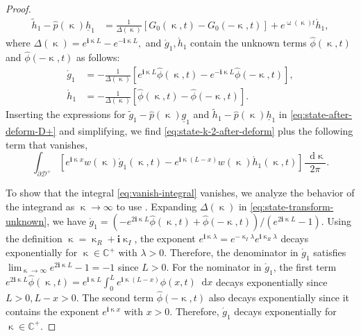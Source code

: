 \documentclass[journal,twoside,web]{ieeecolor}
\newcommand{\CC}{\mathbb{C}}
\newcommand{\D}{\mathcal{D}}
\newcommand{\state}{\phi}
\newcommand{\statehat}{\hat{\state}}
\newcommand{\im}{\mathbf{i}}
\newcommand*\diff{\mathop{}\!\mathrm{d}}
\newcommand{\wcomplex}{\upomega}
\newcommand{\kcomplex}{\upkappa}
\begin{document}
\begin{proof}
\begin{equation*}
\begin{aligned}
		\tilde{h}_1 - \hat{p}(\kcomplex)\underline{h}_1&= \frac{1}{\Delta(\kcomplex)}\left[G_0(\kcomplex,t) - G_0(-\kcomplex,t)\right] + e^{\wcomplex(\kcomplex)t}\acute{h}_1,
	\end{aligned}
\end{equation*}
where
	$\Delta(\kcomplex)= e^{\im \kcomplex L} - e^{-\im \kcomplex L},$
and $\acute{g}_1,\acute{h}_1$ contain the unknown terms $\statehat(\kcomplex,t)$ and $\statehat(-\kcomplex,t)$ as follows:
\begin{align}
			\acute{g}_1 &= -\frac{1}{\Delta(\kcomplex)}\left[e^{\im \kcomplex L}\statehat(\kcomplex,t) - e^{-\im \kcomplex L}\statehat(-\kcomplex,t)\right], \label{eq:state-transform-unknown}\\
		\acute{h}_1 &= -\frac{1}{\Delta(\kcomplex)}\left[\statehat(\kcomplex,t) - \statehat(-\kcomplex,t)\right].
\end{align}
Inserting the expressions for $\tilde{g}_1-\hat{p}(\kcomplex)\underline{g}_1$ and $\tilde{h}_1-\hat{p}(\kcomplex)\underline{h}_1$ in \eqref{eq:state-after-deform-D+} and simplifying, we find \eqref{eq:state-k-2-after-deform} plus the following term that vanishes,
\begin{equation}\label{eq:vanish-integral}
	\int_{\partial\D^+}\left[e^{\im \kcomplex x}w(\kcomplex)\acute{g}_1(\kcomplex,t) - e^{\im \kcomplex(L-x)}w(\kcomplex)\acute{h}_1(\kcomplex,t)\right]\dfrac{\diff \kcomplex}{2\pi}.
\end{equation}


To show that the integral \eqref{eq:vanish-integral} vanishes, we analyze the behavior of the integrand as $\kcomplex\to \infty$ to use . 
Expanding $\Delta(\kcomplex)$ in \eqref{eq:state-transform-unknown}, we have $\acute{g}_1 = (-e^{2\im \kcomplex L}\statehat(\kcomplex,t)+\statehat(-\kcomplex,t))/(e^{2\im \kcomplex L}-1)$.
Using the definition $\kcomplex=\kcomplex_R+\im\kcomplex_I$, the exponent $e^{\im \kcomplex\lambda}=e^{-\kcomplex_I\lambda}e^{\im \kcomplex_R\lambda}$ decays exponentially for $\kcomplex\in\CC^+$ with $\lambda>0$. 
Therefore, the denominator in $\acute{g}_1$ satisfies $\lim_{\kcomplex\to\infty} e^{2\im \kcomplex L}-1 = -1$ since $L >0$. 
For the nominator in $\acute{g}_1$, the first term $e^{2\im \kcomplex L}\statehat(\kcomplex,t) = e^{\im \kcomplex L}\int_{0}^{L}e^{\im \kcomplex (L-x)}\state(x,t)\diff x$ decays exponentially since $L>0,L-x>0$.
The second term $\statehat(-\kcomplex,t)$ also decays exponentially since it contains the exponent $e^{\im \kcomplex x}$ with $x>0$.
Therefore, $\acute{g}_1$ decays exponentially for $\kcomplex\in\CC^+$. 


\end{proof}
\end{document}
